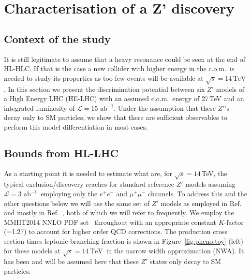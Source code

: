 \documentclass[a4paper,11pt]{article}
\newcommand*{\intlumihelhc}{\ensuremath{\mathcal{L}=15\,\text{ab}^{-1}}}
\newcommand*{\com}{c.o.m.~}
\newcommand*{\sqrtslhc}{\ensuremath{\sqrt{s}=14\,\text{TeV}}}
\renewcommand*{\intlumihelhc}{\ensuremath{\mathcal{L}=15\text{ ab}^{-1}}}
\newcommand*{\intlumihllhc}{\ensuremath{\mathcal{L}=3\text{ ab}^{-1}}}
\begin{document}
\section{Characterisation of a Z' discovery}
\label{sec:zprimedisc}

\subsection{Context of the study}
It is still legitimate to assume that a heavy resonance could be seen at the end of HL-HLC. If that is the case a new collider with higher energy
in the \com is needed to study its properties as too few events will be available at \sqrtslhc. In this section we present the discrimination potential between six $Z'$ models of a High Energy LHC (HE-LHC) with an assumed \com energy of 27\,TeV and an integrated luminosity of \intlumihelhc. Under the assumption that these $Z'$'s decay only to SM particles, we show that there are sufficient observables to perform this model differentiation in most cases.

\subsection{Bounds from HL-LHC}
As a starting point it is needed to estimate what are, for $\sqrt s=14$\,TeV, the typical exclusion/discovery reaches for standard reference $Z'$ models assuming \intlumihllhc\ employing only the $e^+e^-$ and $\mu^+\mu^-$ channels. To address this and the other questions below we will use the same set of $Z'$ models as employed
in Ref.~\cite{Rizzo:2014xma} and mostly in Ref.~\cite{Han:2013mra}, both of which we will refer to frequently. We employ the MMHT2014 NNLO PDF set~\cite{Harland-Lang:2014zoa}
throughout with an appropriate constant $K$-factor (=1.27) to account for higher order QCD corrections. The production cross section times leptonic branching fraction is shown in Figure~\ref{fig:pheno:toy} (left) for these models at \sqrtslhc\ in the narrow width approximation (NWA). It has been and will be assumed here that these $Z'$ states only decay to SM particles.
\end{document}

